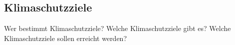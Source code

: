 











\subsection{Klimaschutzziele}
Wer bestimmt Klimaschutzziele?
Welche Klimaschutzziele gibt es?
Welche Klimaschutzziele sollen erreicht werden?



\newpage



































